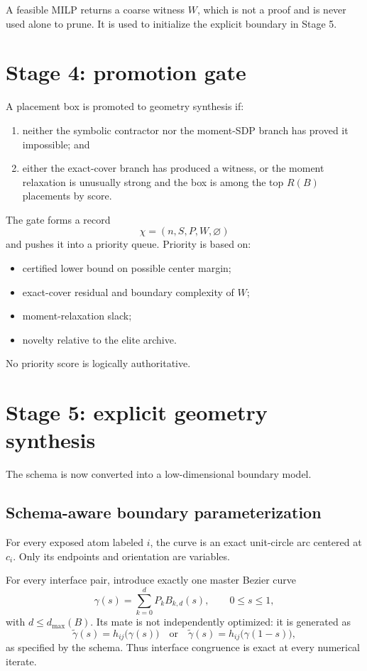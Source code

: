 \documentclass[11pt]{article}
\begin{document}
A feasible MILP returns a coarse witness $W$, which is not a proof and is never used alone to prune. It is used to initialize the explicit boundary in Stage 5.

\section{Stage 4: promotion gate}

A placement box is promoted to geometry synthesis if:
\begin{enumerate}[leftmargin=9mm]
\item neither the symbolic contractor nor the moment-SDP branch has proved it impossible; and
\item either the exact-cover branch has produced a witness, or the moment relaxation is unusually strong and the box is among the top $R(B)$ placements by score.
\end{enumerate}

The gate forms a record
\[
\chi=(n,S,P,W,\varnothing)
\]
and pushes it into a priority queue. Priority is based on:
\begin{itemize}[leftmargin=7mm]
\item certified lower bound on possible center margin;
\item exact-cover residual and boundary complexity of $W$;
\item moment-relaxation slack;
\item novelty relative to the elite archive.
\end{itemize}
No priority score is logically authoritative.

\section{Stage 5: explicit geometry synthesis}

The schema is now converted into a low-dimensional boundary model.

\subsection{Schema-aware boundary parameterization}

For every exposed atom labeled $i$, the curve is an exact unit-circle arc centered at $c_i$. Only its endpoints and orientation are variables.

For every interface pair, introduce exactly one master Bezier curve
\[
\gamma(s)=\sum_{k=0}^{d} P_k B_{k,d}(s),\qquad 0\le s\le1,
\]
with $d\le d_{\max}(B)$. Its mate is not independently optimized: it is generated as
\[
\widetilde\gamma(s)=h_{ij}\bigl(\gamma(s)\bigr)
\quad\text{or}\quad
\widetilde\gamma(s)=h_{ij}\bigl(\gamma(1-s)\bigr),
\]
as specified by the schema. Thus interface congruence is exact at every numerical iterate.
\end{document}
